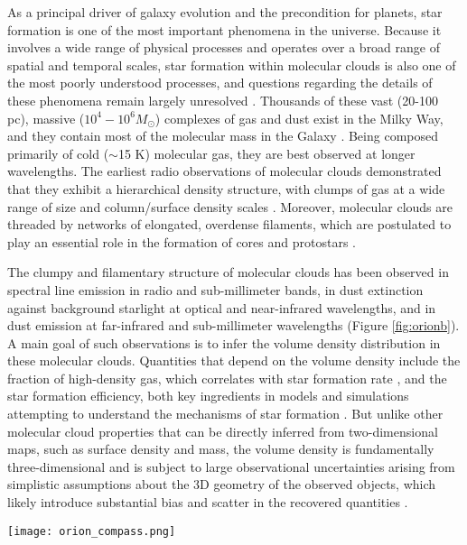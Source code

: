 \documentclass[twocolumn]{aastex63}
\begin{document}
As a principal driver of galaxy evolution and the precondition for planets, star formation is one of the most important phenomena in the universe. Because it involves a wide range of physical processes and operates over a broad range of spatial and temporal scales, star formation within molecular clouds is also one of the most poorly understood processes, and questions regarding the details of these phenomena remain largely unresolved \citep{mckee_2007, krumholz_2019}.  Thousands of these vast (20-100 pc), massive ($10^4-10^6 M_\odot$) complexes of gas and dust exist in the Milky Way, and they contain most of the molecular mass in the Galaxy \citep{Rice_2016, Miville-Deschenes_2017}.  Being composed primarily of cold ($\sim$15 K) molecular gas, they are best observed at longer wavelengths.  The earliest radio observations of molecular clouds demonstrated that they exhibit a hierarchical density structure, with clumps of gas at a wide range of size and column/surface density scales \citep[e.g.,][]{Williams_2000}.  Moreover, molecular clouds are threaded by networks of elongated, overdense filaments, which are postulated to play an essential role in the formation of cores and protostars \citep{Molinari_2010, Andre_2014}.  
 
The clumpy and filamentary structure of molecular clouds has been observed in spectral line emission in radio and sub-millimeter bands, in dust extinction against background starlight at optical and near-infrared wavelengths, and in dust emission at far-infrared and sub-millimeter wavelengths (Figure \ref{fig:orionb}).  A main goal of such observations is to infer the volume density distribution in these molecular clouds.  Quantities that depend on the volume density include the fraction of high-density gas, which correlates with star formation rate \citep[e.g.,][]{Lada_2010}, and the star formation efficiency, both key ingredients in models and simulations attempting to understand the mechanisms of star formation \citep[e.g.,][]{Krumholz_2005}.  But unlike other molecular cloud properties that can be directly inferred from two-dimensional maps, such as surface density and mass, the volume density is fundamentally three-dimensional and is subject to large observational uncertainties arising from simplistic assumptions about the 3D geometry of the observed objects, which likely introduce substantial bias and scatter in the recovered quantities \citep{Hu_2021}.

\begin{figure*}[ht!]
    \centering
    \texttt{[image: orion\_compass.png]}
    \caption{ Far-infrared image of dust emission in the Orion B molecular cloud, from ESA's \textit{Herschel} Space Observatory.  Blue, red, and green correspond to observations at 70 $\mu$m, 160 $\mu$m, and 250 $\mu$m, respectively.  Networks of long, thin filaments thread the cloud, and are sometimes accompanied by bright, compact cores and protostars. Image credit: European Space Agency (ESA).}
    \label{fig:orionb}
\end{figure*}
\end{document}
